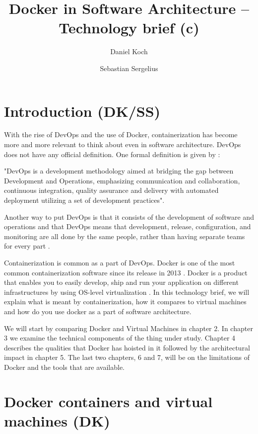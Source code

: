 \documentclass[fleqn,12pt]{olplainarticle}
\title{Docker in Software Architecture – Technology brief (c)}
\author[1]{Daniel Koch}
\author[2]{Sebastian Sergelius}
\affil[1]{daniel.koch@helsinki.fi}
\affil[2]{sebastian.sergelius@helsinki.fi}
\begin{document}
\flushbottom
\maketitle
\thispagestyle{empty}
\pagebreak
\tableofcontents
\section{Introduction (DK/SS)}

With the rise of DevOps and the use of Docker, containerization has become more and more relevant to think about even in software architecture. DevOps does not have any official definition.
One formal definition is given by \cite{Jabbari_devops}: 
\begin{displayquote}
"DevOps is a development methodology aimed at bridging the gap between Development and Operations, emphasizing communication and collaboration, continuous integration, quality assurance and delivery with automated deployment utilizing a set of development practices".
\end{displayquote}
Another way to put DevOps is that it consists of the development of software and operations and that DevOps means that development, release, configuration, and monitoring are all done by the same people, rather than having separate teams for every part \citep{hy:DevOps_with_Docker}.

Containerization is common as a part of DevOps. Docker is one of the most common containerization software since its release in 2013 \citep{aquasec:orchestration}. Docker is a product that enables you to easily develop, ship and run your application on different infrastructures by using OS-level virtualization \citep{docker:overview}. In this technology brief, we will explain what is meant by containerization, how it compares to virtual machines and how do you use docker as a part of software architecture. 

We will start by comparing Docker and Virtual Machines in chapter 2. In chapter 3 we examine the technical components of the thing under study. Chapter 4 describes the qualities that Docker has hoisted in it followed by the architectural impact in chapter 5. The last two chapters, 6 and 7, will be on the limitations of Docker and the tools that are available.


\section{Docker containers and virtual machines (DK)}
\end{document}
